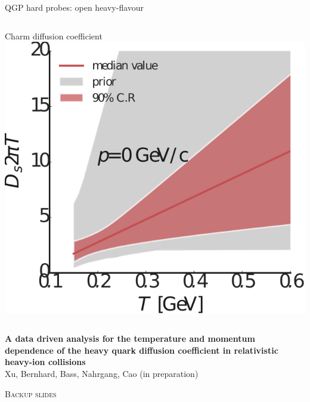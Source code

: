 \documentclass{beamer}
\begin{document}
\begin{frame}{QGP hard probes: open heavy-flavour}
\begin{columns}[T]
\begin{column}{.45\textwidth}
      \centering \small Charm diffusion coefficient\\[.5ex]
      \includegraphics[width=.9\textwidth]{Plot_D2piT_posterior_T}
    \end{column}
  \end{columns}
  \begin{flushleft}
    \scriptsize
    \textbf{A data driven analysis for the temperature and momentum dependence of the heavy quark diffusion coefficient in relativistic heavy-ion collisions}\\
    Xu, Bernhard, Bass, Nahrgang, Cao (in preparation)
  \end{flushleft}
\end{frame}

\appendix

\begin{frame}
  \begin{center}
    \scshape Backup slides
  \end{center}
\end{frame}
\end{document}

